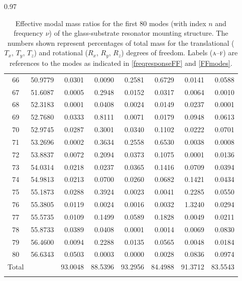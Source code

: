 \documentclass[../Thesis-IJspeert.tex]{subfiles}
\begin{document}
\begin{spacing}{0.97}
\begin{small}
\begin{longtable}{crrrrrrr}
			66 & 50.9779 & 0.0301 & 0.0090 & 0.2581 & 0.6729 & 0.0141 & 0.0588 \\  
			67 & 51.6087 & 0.0005 & 0.2948 & 0.0152 & 0.0317 & 0.0064 & 0.0010 \\  
			68 & 52.3183 & 0.0001 & 0.0408 & 0.0024 & 0.0149 & 0.0237 & 0.0001 \\  
			69 & 52.7680 & 0.0333 & 0.8111 & 0.0071 & 0.0179 & 0.0948 & 0.0613 \\  
			70 & 52.9745 & 0.0287 & 0.3001 & 0.0340 & 0.1102 & 0.0222 & 0.0701 \\  
			71 & 53.2696 & 0.0002 & 0.3634 & 0.2558 & 0.6530 & 0.0038 & 0.0008 \\  
			72 & 53.8837 & 0.0072 & 0.2094 & 0.0373 & 0.1075 & 0.0001 & 0.0136 \\  
			73 & 54.0314 & 0.0218 & 0.0237 & 0.0365 & 0.1416 & 0.0709 & 0.0394 \\  
			74 & 54.9813 & 0.0213 & 0.0700 & 0.0260 & 0.0682 & 0.1421 & 0.0434 \\  
			75 & 55.1873 & 0.0288 & 0.3924 & 0.0023 & 0.0041 & 0.2285 & 0.0550 \\  
			76 & 55.3805 & 0.0119 & 0.0024 & 0.0016 & 0.0032 & 1.3240 & 0.0294 \\  
			77 & 55.5735 & 0.0109 & 0.1499 & 0.0589 & 0.1828 & 0.0049 & 0.0211 \\  
			78 & 55.8733 & 0.0389 & 0.0408 & 0.0001 & 0.0014 & 0.0069 & 0.0830 \\  
			79 & 56.4600 & 0.0094 & 0.2288 & 0.0135 & 0.0565 & 0.0048 & 0.0184 \\  
			80 & 56.6343 & 0.0503 & 0.0003 & 0.0000 & 0.0028 & 0.0836 & 0.0974 \\  
			\midrule
			{Total} & {} & 93.0048 & 88.5396 & 93.2956 & 84.4988 & 91.3712 & 83.5543 \\
			\bottomrule
			\caption[Effective modal mass ratios of the glass-substrate resonator mounting structure]{Effective modal mass ratios for the first \num{80} modes (with index $n$ and frequency $\nu$) of the glass-substrate resonator mounting structure. The numbers shown represent percentages of total mass for the translational (${T}_x$, ${T}_y$, ${T}_z$) and rotational (${R}_x$, ${R}_y$, ${R}_z$) degrees of freedom. Labels (\textsc{a--f}) are references to the modes as indicated in \autoref{freqresponseFF} and \autoref{FFmodes}.}
			\label{tab:modepercentFinalfinger}   
		\end{longtable}
	\end{small}
\end{spacing}
\end{document}

